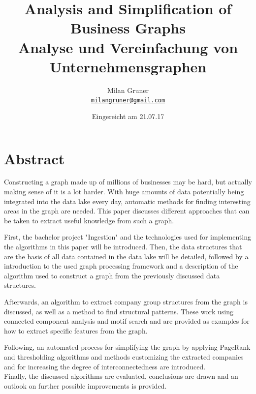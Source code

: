 \documentclass[
        a4paper,     %
        titlepage,   %
        oneside,     %
        parskip      %
]{scrartcl}          %
\title{
  Analysis and Simplification of\\Business Graphs
  \\ \bigskip
  \large{Analyse und Vereinfachung von Unternehmensgraphen}
}
\author{Milan Gruner\\\small{\href{mailto:milangruner@gmail.com}{\nolinkurl{milangruner@gmail.com}}}}
\date{Eingereicht am 21.07.17}
\begin{document}
  \maketitle %
  \clearpage %

  \section*{Abstract}
  { \large
    Constructing a graph made up of millions of businesses may be hard, but actually making sense of it is a lot harder.
    With huge amounts of data potentially being integrated into the data lake every day, automatic methods for finding interesting areas in the graph are needed.
    This paper discusses different approaches that can be taken to extract useful knowledge from such a graph.

    First, the bachelor project "Ingestion" and the technologies used
    for implementing the algorithms in this paper will be introduced.
    Then, the data structures that are the basis of all data contained in the
    data lake will be detailed, followed by a introduction to the used graph processing
    framework and a description of the algorithm used to construct a graph from the
    previously discussed data structures.

    Afterwards, an algorithm to extract company group structures from the graph
    is discussed, as well as a method to find structural patterns. These work using
    connected component analysis and motif search and are provided as examples for
    how to extract specific features from the graph.

    Following, an automated process for simplifying the graph by applying PageRank
    and thresholding algorithms and methods customizing the extracted companies
    and for increasing the degree of interconnectedness are introduced.\\
    Finally, the discussed algorithms are evaluated, conclusions are drawn
    and an outlook on further possible improvements is provided.
  }
  \clearpage
  
\end{document}
